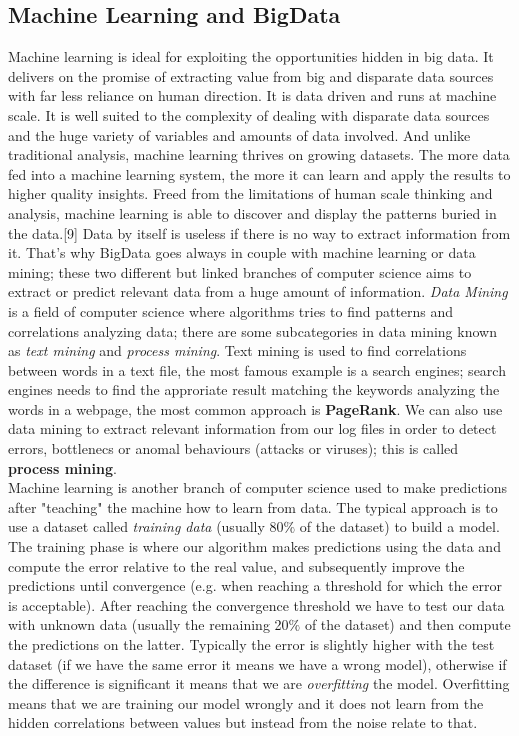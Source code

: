 \documentclass{sig-alternate-05-2015}
\begin{document}
\subsection{Machine Learning and BigData}
Machine learning is ideal for exploiting the opportunities hidden in big data.
It delivers on the promise of extracting value from big and disparate data sources with far less reliance on human
direction. It is data driven and runs at machine scale.
It is well suited to the complexity of dealing with disparate
data sources and the huge variety of variables and amounts of data involved.
And unlike traditional analysis, machine learning thrives on growing datasets.
The more data fed into a machine learning system, the more it can learn and apply
the results to higher quality insights.
Freed from the limitations of human scale thinking and analysis, machine learning is able to discover and display the patterns buried in the data.[9]
Data by itself is useless if there is no way to extract information from it.
That's why BigData goes always in couple with machine learning or data mining;
these two different but linked branches of computer science aims to extract or predict
relevant data from a huge amount of information. \textit{Data Mining} is a
field of computer science where algorithms tries to find patterns and correlations
analyzing data; there are some subcategories in data mining known as \textit{text mining}
and \textit{process mining}. Text mining is used to find correlations between words
in a text file, the most famous example is a search engines; search engines needs to
find the approriate result matching the keywords analyzing the words in a webpage, the most
common approach is \textbf{PageRank}. We can also use data mining to extract
relevant information from our log files in order to detect errors, bottlenecs
or anomal behaviours (attacks or viruses); this is called \textbf{process mining}.\\
Machine learning is another branch of computer science used to make predictions
after "teaching" the machine how to learn from data. The typical approach is
to use a dataset called \textit{training data} (usually 80$\%$ of the dataset) to
build a model. The training phase is where our algorithm makes predictions using
the data and compute the error relative to the real value, and subsequently
improve the predictions until convergence (e.g. when reaching a threshold for which
the error is acceptable). After reaching the convergence threshold we have to
test our data with unknown data (usually the remaining 20$\%$ of the dataset)
and then compute the predictions on the latter. Typically
the error is slightly higher with the test dataset (if we have the same error it means we have a wrong model),
otherwise if the difference is significant it means that we are \textit{overfitting} the model. Overfitting means
that we are training our model wrongly and it does not learn from the hidden correlations
between values but instead from the noise relate to that.
\end{document}
